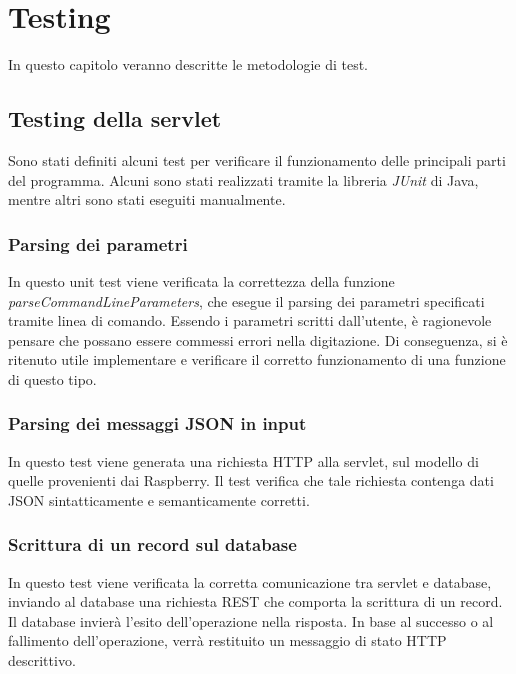 \chapter{Testing}

In questo capitolo veranno descritte le metodologie di test.

\section{Testing della servlet}
Sono stati definiti alcuni test per verificare il funzionamento delle principali parti del programma.
Alcuni sono stati realizzati tramite la libreria \textit{JUnit} di Java, mentre altri sono stati eseguiti manualmente.

\subsection{Parsing dei parametri}
In questo unit test viene verificata la correttezza della funzione \textit{parseCommandLineParameters}, che esegue il parsing dei parametri specificati tramite linea di comando.
Essendo i parametri scritti dall'utente, è ragionevole pensare che possano essere commessi errori nella digitazione.
Di conseguenza, si è ritenuto utile implementare e verificare il corretto funzionamento di una funzione di questo tipo.

\subsection{Parsing dei messaggi JSON in input}
In questo test viene generata una richiesta HTTP alla servlet, sul modello di quelle provenienti dai Raspberry. Il test verifica che tale richiesta contenga dati JSON sintatticamente e semanticamente corretti.

\subsection{Scrittura di un record sul database}
In questo test viene verificata la corretta comunicazione tra servlet e database, inviando al database una richiesta REST che comporta la scrittura di un record.
Il database invierà l'esito dell'operazione nella risposta. In base al successo o al fallimento dell'operazione, verrà restituito un messaggio di stato HTTP descrittivo.

